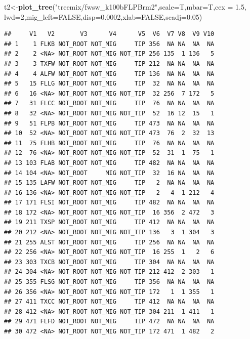 \documentclass[]{article}
\newenvironment{Shaded}{\begin{snugshade}}{\end{snugshade}}
\newcommand{\KeywordTok}[1]{\textcolor[rgb]{0.13,0.29,0.53}{\textbf{#1}}}
\newcommand{\DataTypeTok}[1]{\textcolor[rgb]{0.13,0.29,0.53}{#1}}
\newcommand{\DecValTok}[1]{\textcolor[rgb]{0.00,0.00,0.81}{#1}}
\newcommand{\FloatTok}[1]{\textcolor[rgb]{0.00,0.00,0.81}{#1}}
\newcommand{\StringTok}[1]{\textcolor[rgb]{0.31,0.60,0.02}{#1}}
\newcommand{\OtherTok}[1]{\textcolor[rgb]{0.56,0.35,0.01}{#1}}
\newcommand{\NormalTok}[1]{#1}
\begin{document}
\begin{Shaded}
\begin{Highlighting}[]
\NormalTok{t2<-}\KeywordTok{plot_tree}\NormalTok{(}\StringTok{"treemix/fwsw_k100bFLPBrm2"}\NormalTok{,}\DataTypeTok{scale=}\NormalTok{T,}\DataTypeTok{mbar=}\NormalTok{T,}\DataTypeTok{cex =} \FloatTok{1.5}\NormalTok{,}
              \DataTypeTok{lwd=}\DecValTok{2}\NormalTok{,}\DataTypeTok{mig_left=}\OtherTok{FALSE}\NormalTok{,}\DataTypeTok{disp=}\FloatTok{0.0002}\NormalTok{,}\DataTypeTok{xlab=}\OtherTok{FALSE}\NormalTok{,}\DataTypeTok{scadj=}\FloatTok{0.05}\NormalTok{)}
\end{Highlighting}
\end{Shaded}

\begin{verbatim}
##     V1   V2       V3      V4      V5  V6  V7 V8  V9 V10
## 1    1 FLKB NOT_ROOT NOT_MIG     TIP 356  NA NA  NA  NA
## 2    2 <NA> NOT_ROOT NOT_MIG NOT_TIP 256 135  1 136   5
## 3    3 TXFW NOT_ROOT NOT_MIG     TIP 212  NA NA  NA  NA
## 4    4 ALFW NOT_ROOT NOT_MIG     TIP 136  NA NA  NA  NA
## 5   15 FLLG NOT_ROOT NOT_MIG     TIP  32  NA NA  NA  NA
## 6   16 <NA> NOT_ROOT NOT_MIG NOT_TIP  32 256  7 172   5
## 7   31 FLCC NOT_ROOT NOT_MIG     TIP  76  NA NA  NA  NA
## 8   32 <NA> NOT_ROOT NOT_MIG NOT_TIP  52  16 12  15   1
## 9   51 FLPB NOT_ROOT NOT_MIG     TIP 473  NA NA  NA  NA
## 10  52 <NA> NOT_ROOT NOT_MIG NOT_TIP 473  76  2  32  13
## 11  75 FLHB NOT_ROOT NOT_MIG     TIP  76  NA NA  NA  NA
## 12  76 <NA> NOT_ROOT NOT_MIG NOT_TIP  52  31  1  75   1
## 13 103 FLAB NOT_ROOT NOT_MIG     TIP 482  NA NA  NA  NA
## 14 104 <NA> NOT_ROOT     MIG NOT_TIP  32  16 NA  NA  NA
## 15 135 LAFW NOT_ROOT NOT_MIG     TIP   2  NA NA  NA  NA
## 16 136 <NA> NOT_ROOT NOT_MIG NOT_TIP   2   4  1 212   4
## 17 171 FLSI NOT_ROOT NOT_MIG     TIP 482  NA NA  NA  NA
## 18 172 <NA> NOT_ROOT NOT_MIG NOT_TIP  16 356  2 472   3
## 19 211 TXSP NOT_ROOT NOT_MIG     TIP 412  NA NA  NA  NA
## 20 212 <NA> NOT_ROOT NOT_MIG NOT_TIP 136   3  1 304   3
## 21 255 ALST NOT_ROOT NOT_MIG     TIP 256  NA NA  NA  NA
## 22 256 <NA> NOT_ROOT NOT_MIG NOT_TIP  16 255  1   2   6
## 23 303 TXCB NOT_ROOT NOT_MIG     TIP 304  NA NA  NA  NA
## 24 304 <NA> NOT_ROOT NOT_MIG NOT_TIP 212 412  2 303   1
## 25 355 FLSG NOT_ROOT NOT_MIG     TIP 356  NA NA  NA  NA
## 26 356 <NA> NOT_ROOT NOT_MIG NOT_TIP 172   1  1 355   1
## 27 411 TXCC NOT_ROOT NOT_MIG     TIP 412  NA NA  NA  NA
## 28 412 <NA> NOT_ROOT NOT_MIG NOT_TIP 304 211  1 411   1
## 29 471 FLFD NOT_ROOT NOT_MIG     TIP 472  NA NA  NA  NA
## 30 472 <NA> NOT_ROOT NOT_MIG NOT_TIP 172 471  1 482   2

\end{verbatim}
\end{document}
